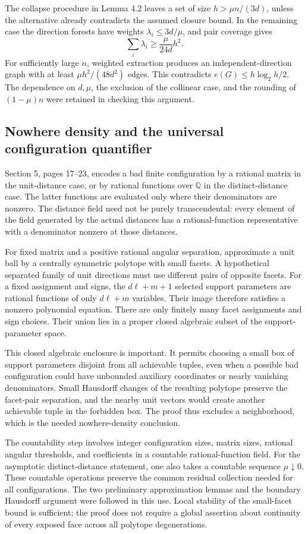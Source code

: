 \documentclass[10pt]{article}
\begin{document}
The collapse procedure in Lemma 4.2 leaves a set of size \(h>\mu n/(3d)\), unless the alternative already contradicts the assumed closure bound. In the remaining case the direction forests have weights \(\lambda_i\le3d/\mu\), and pair coverage gives \[\sum_i\lambda_i\ge \frac{\mu}{24d}h^2.\] For sufficiently large \(n\), weighted extraction produces an independent-direction graph with at least \(\mu h^2/(48d^2)\) edges. This contradicts \(e(G)\le h\log_2 h/2\). The dependence on \(d,\mu\), the exclusion of the collinear case, and the rounding of \((1-\mu)n\) were retained in checking this argument.\par
\subsection*{Nowhere density and the universal configuration quantifier}
Section 5, pages 17–23, encodes a bad finite configuration by a rational matrix in the unit-distance case, or by rational functions over \(\mathbb Q\) in the distinct-distance case. The latter functions are evaluated only where their denominators are nonzero. The distance field need not be purely transcendental: every element of the field generated by the actual distances has a rational-function representative with a denominator nonzero at those distances.\par
For fixed matrix and a positive rational angular separation, approximate a unit ball by a centrally symmetric polytope with small facets. A hypothetical separated family of unit directions must use different pairs of opposite facets. For a fixed assignment and signs, the \(d\ell+m+1\) selected support parameters are rational functions of only \(d\ell+m\) variables. Their image therefore satisfies a nonzero polynomial equation. There are only finitely many facet assignments and sign choices. Their union lies in a proper closed algebraic subset of the support-parameter space.\par
This closed algebraic enclosure is important. It permits choosing a small box of support parameters disjoint from all achievable tuples, even when a possible bad configuration could have unbounded auxiliary coordinates or nearly vanishing denominators. Small Hausdorff changes of the resulting polytope preserve the facet-pair separation, and the nearby unit vectors would create another achievable tuple in the forbidden box. The proof thus excludes a neighborhood, which is the needed nowhere-density conclusion.\par
The countability step involves integer configuration sizes, matrix sizes, rational angular thresholds, and coefficients in a countable rational-function field. For the asymptotic distinct-distance statement, one also takes a countable sequence \(\mu\downarrow0\). These countable operations preserve the common residual collection needed for all configurations. The two preliminary approximation lemmas and the boundary Hausdorff argument were followed in this use. Local stability of the small-facet bound is sufficient; the proof does not require a global assertion about continuity of every exposed face across all polytope degenerations.\par
\end{document}
